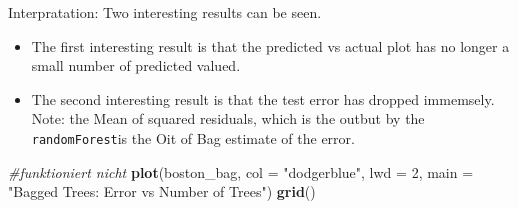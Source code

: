 \documentclass[]{report}
\newenvironment{Shaded}{\begin{snugshade}}{\end{snugshade}}
\newcommand{\KeywordTok}[1]{\textcolor[rgb]{0.13,0.29,0.53}{\textbf{#1}}}
\newcommand{\DataTypeTok}[1]{\textcolor[rgb]{0.13,0.29,0.53}{#1}}
\newcommand{\DecValTok}[1]{\textcolor[rgb]{0.00,0.00,0.81}{#1}}
\newcommand{\StringTok}[1]{\textcolor[rgb]{0.31,0.60,0.02}{#1}}
\newcommand{\CommentTok}[1]{\textcolor[rgb]{0.56,0.35,0.01}{\textit{#1}}}
\newcommand{\OperatorTok}[1]{\textcolor[rgb]{0.81,0.36,0.00}{\textbf{#1}}}
\newcommand{\NormalTok}[1]{#1}
\providecommand{\tightlist}{%
  \setlength{\itemsep}{0pt}\setlength{\parskip}{0pt}}
\begin{document}
\begin{Shaded}
\end{Shaded}

\begin{Shaded}
\end{Shaded}

Interpratation: Two interesting results can be seen.

\begin{itemize}
\tightlist
\item
  The first interesting result is that the predicted vs actual plot has
  no longer a small number of predicted valued.
\item
  The second interesting result is that the test error has dropped
  immemsely. Note: the Mean of squared residuals, which is the outbut by
  the \texttt{randomForest}is the Oit of Bag estimate of the error.
\end{itemize}

\begin{Shaded}
\begin{Highlighting}[]
\CommentTok{#funktioniert nicht}
\KeywordTok{plot}\NormalTok{(boston_bag, }\DataTypeTok{col =} \StringTok{"dodgerblue"}\NormalTok{, }\DataTypeTok{lwd =} \DecValTok{2}\NormalTok{, }\DataTypeTok{main =} \StringTok{"Bagged Trees: Error vs Number of Trees"}\NormalTok{)}
\KeywordTok{grid}\NormalTok{()}
\end{Highlighting}
\end{Shaded}
\end{document}
